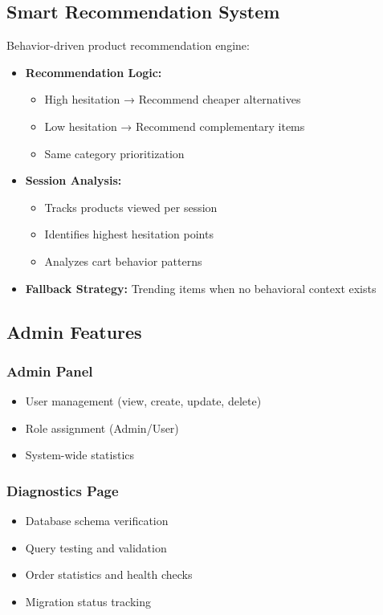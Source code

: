 \documentclass[12pt,a4paper]{article}
\begin{document}
\subsection{Smart Recommendation System}

Behavior-driven product recommendation engine:

\begin{itemize}[leftmargin=*]
    \item \textbf{Recommendation Logic:}
    \begin{itemize}
        \item High hesitation → Recommend cheaper alternatives
        \item Low hesitation → Recommend complementary items
        \item Same category prioritization
    \end{itemize}
    
    \item \textbf{Session Analysis:}
    \begin{itemize}
        \item Tracks products viewed per session
        \item Identifies highest hesitation points
        \item Analyzes cart behavior patterns
    \end{itemize}
    
    \item \textbf{Fallback Strategy:} Trending items when no behavioral context exists
\end{itemize}

\subsection{Admin Features}

\subsubsection{Admin Panel}
\begin{itemize}[leftmargin=*]
    \item User management (view, create, update, delete)
    \item Role assignment (Admin/User)
    \item System-wide statistics
\end{itemize}

\subsubsection{Diagnostics Page}
\begin{itemize}[leftmargin=*]
    \item Database schema verification
    \item Query testing and validation
    \item Order statistics and health checks
    \item Migration status tracking
\end{itemize}
\end{document}
